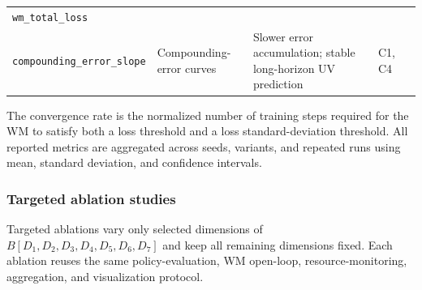 \documentclass{article}
\theoremstyle{plain}
\theoremstyle{definition}
\theoremstyle{remark}
\begin{document}
\begin{table}[h!]
{\begin{tabular}{lllll}
      \texttt{wm\_total\_loss}                                                                                                      &
      \makecell[l]{
      \texttt{wm\_total\_loss\_standard\_deviation};                                                                                  \\
        \texttt{compounding\_error\_slope}
      }                                                                                                                             &
      Compounding-error curves                                                                                                      &
      Slower error accumulation; stable long-horizon UV prediction                                                                  &
      C1, C4                                                                                                                          \\

      \bottomrule
    \end{tabular}
  }
\end{table}

The convergence rate is the normalized number of training steps required for the WM to satisfy both a loss threshold and a loss standard-deviation threshold. All reported metrics are aggregated across seeds, variants, and repeated runs using mean, standard deviation, and confidence intervals.

\subsubsection{Targeted ablation studies}
\label{sec:targeted_ablation}

Targeted ablations vary only selected dimensions of $B[D_1,D_2,D_3,D_4,D_5,D_6,D_7]$ and keep all remaining dimensions fixed. Each ablation reuses the same policy-evaluation, WM open-loop, resource-monitoring, aggregation, and visualization protocol.
\end{document}
